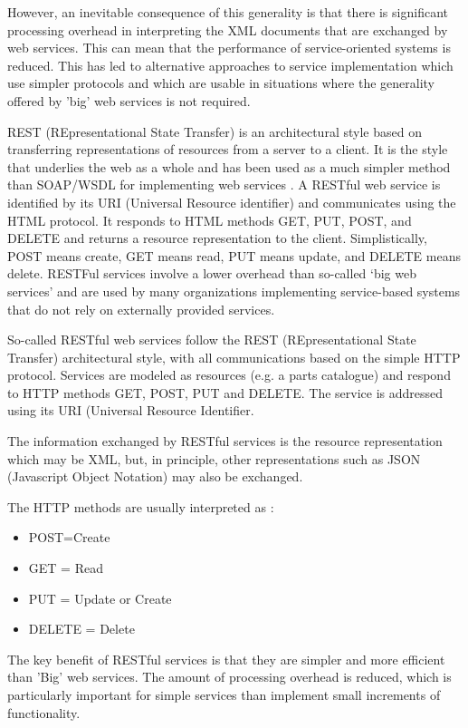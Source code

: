 \documentclass[12pt,a4paper,final,twoside,onecolumn,titlepage]{book}
\begin{document}
However, an inevitable consequence of this generality is that there is significant processing overhead in interpreting the \gls{XML} documents that are exchanged by web services. This can mean that the performance of service-oriented systems is reduced. This has led to alternative approaches to service implementation which use simpler protocols and which are usable in situations where the generality offered by 'big' web services is not required.

REST (REpresentational State Transfer) is an architectural style based on transferring representations of resources from a server to a client. It is the style that underlies the web as a whole and has been used as a much simpler method than \gls{SOAP}/\gls{WSDL} for implementing web services \cite{SWE9}.
A RESTful web service is identified by its URI (Universal Resource identifier) and communicates using the HTML protocol. It responds to HTML methods GET, PUT, POST, and DELETE and returns a resource representation to the client. Simplistically, POST means create, GET means read, PUT means update, and DELETE means delete.
RESTFul services involve a lower overhead than so-called ‘big web services’ and are used by many organizations implementing service-based systems that do not rely on externally provided services.

So-called RESTful web services follow the REST (REpresentational State Transfer) architectural style, with all communications based on the simple \gls{HTTP} protocol. Services are modeled as resources (e.g. a parts catalogue) and respond to \gls{HTTP} methods GET, POST, PUT and DELETE. The service is addressed using its URI (Universal Resource Identifier.

The information exchanged by RESTful services is the resource representation which may be \gls{XML}, but, in principle, other representations such as JSON (Javascript Object Notation) may also be exchanged.

The \gls{HTTP} methods are usually interpreted as \cite{RESTful}:
\begin{itemize}
\item POST=Create
\item GET = Read
\item PUT = Update or Create
\item DELETE = Delete
\end{itemize}
The key benefit of RESTful services is that they are simpler and more efficient than 'Big' web services. The amount of processing overhead is reduced, which is particularly important for simple services than implement small increments of functionality.
\end{document}
